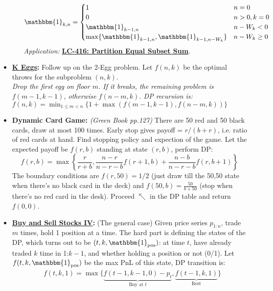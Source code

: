 \documentclass[9pt, landscape]{article}
\begin{document}
\begin{multicols*}{3}
\begin{itemize}
\begin{itemize}[leftmargin=10pt,noitemsep,topsep=0pt,partopsep=0pt]
		$$
		\mathbbm{1}_{k,n} = \begin{cases}
		1 & n = 0 \\
		0 & n > 0, k=0\\
		\mathbbm{1}_{k-1, n} & n-W_k < 0 \\
		\max\{\mathbbm{1}_{k-1, n}, \mathbbm{1}_{k-1,n-W_k} \} & n-W_k \geq 0
		\end{cases}
		$$
		\emph{Application: } \textbf{\href{https://leetcode.com/problems/partition-equal-subset-sum/submissions/}{LC-416: Partition Equal Subset Sum}}.
	\end{itemize}
	\item \textbf{\href{http://datagenetics.com/blog/july22012/index.html}{K Eggs}:} Follow up on the 2-Egg problem. Let $f(n, k)$ be the optimal throws for the subproblem $(n, k)$. \\
	\textit{Drop the first egg on floor $m$. If it breaks, the remaining problem is $f(m-1, k-1)$, otherwise $f(n-m, k)$. DP recursion is:}\\
	\textit{$f(n, k) = \min_{1\leq m<n} \{1 + \max(f(m-1, k-1), f(n-m, k))\}$}
	\item \textbf{Dynamic Card Game:} \textit{(Green Book pp.127)} There are 50 red and 50 black cards, draw at most 100 times. Early stop gives payoff = $r /(b+r)$, i.e. ratio of red cards at hand. Find stopping policy and expection of the game. Let the expected payoff be $f(r,b)$ standing at state $(r,b)$, perform DP:
	$$
	f(r, b) = \max\left\{ \frac{r}{r+b}, \frac{n-r}{n-r-b} f(r+1, b) + \frac{n-b}{n-r-b}f(r, b+1)\right\}
	$$
	The boundary conditions are $f(r, 50) = 1/2$ (just draw till the 50,50 state when there's no black card in the deck) and $f(50, b) = \frac{50}{b+50}$ (stop when there's no red card in the desk). Proceed $\nwarrow$ in the DP table and return $f(0, 0)$.
	\item \textbf{\href{https://labuladong.gitbook.io/algo/dong-tai-gui-hua-xi-lie/tuan-mie-gu-piao-wen-ti}{Buy and Sell Stocks IV}:} (The general case) Given price series $p_{1:n}$, trade $m$ times, hold 1 position at a time. The hard part is defining the states of the DP, which turns out to be $(t, k, \mathbbm{1}_{\text{pos}})$: at time $t$, have already traded $k$ time in 1:$k-1$, and whether holding a position or not (0/1). Let $f(t, k, \mathbbm{1}_{\text{pos}})$ be the max PnL of this state, DP transition is: 
	\begin{equation*}
		\begin{split}
			&f(t, k, 1) = \max\{\underbrace{f(t-1, k-1, 0) - p_t}_{\text{Buy at } t}, \underbrace{f(t-1, k, 1)}_{\text{Rest}} \} \\

\end{split}
\end{equation*}
\end{itemize}
\end{multicols*}
\end{document}
